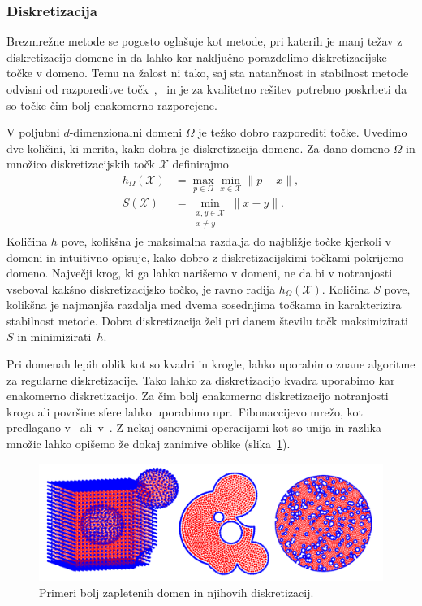 \documentclass[12pt,a4paper,twoside]{article}
\theoremstyle{definition} %
\theoremstyle{plain} %
\numberwithin{equation}{section}
\newcommand{\X}{\mathcal{X}}
\begin{document}
\subsubsection{Diskretizacija}
Brezmrežne metode se pogosto oglašuje kot metode, pri katerih je manj težav z diskretizacijo domene
in da lahko kar naključno porazdelimo diskretizacijske točke v domeno. Temu na žalost ni tako, saj
sta natančnost in stabilnost metode odvisni od razporeditve
točk~\cite[slika~8]{kosec2016local},~\cite{amani2012mixed} in je za kvalitetno rešitev potrebno
poskrbeti da so točke čim bolj enakomerno razporejene.

V poljubni $d$-dimenzionalni domeni $\Omega$ je težko dobro razporediti točke.
Uvedimo dve količini, ki merita, kako dobra je diskretizacija domene.
Za dano domeno $\Omega$ in množico diskretizacijskih točk $\X$ definirajmo
\begin{align}
  h_\Omega(\X) &= \max_{p \in \Omega} \min_{x \in \X} \|p - x\|, \\
  \label{eq:def-hs}
  S(\X) &= \min_{\substack{x, y \in \X \\ x \neq y}} \|x-y\|.
\end{align}
Količina $h$ pove, kolikšna je maksimalna razdalja do najbližje točke kjerkoli v domeni in intuitivno
opisuje, kako dobro z diskretizacijskimi točkami pokrijemo domeno. Največji krog, ki ga lahko
narišemo v domeni, ne da bi v notranjosti vseboval kakšno diskretizacijsko točko, je ravno radija
$h_\Omega(\X)$. Količina $S$ pove, kolikšna je najmanjša razdalja med dvema sosednjima točkama in
karakterizira stabilnost metode. Dobra diskretizacija želi pri danem številu točk maksimizirati $S$
in minimizirati~$h$.

Pri domenah lepih oblik kot so kvadri in krogle, lahko uporabimo znane algoritme za regularne
diskretizacije. Tako lahko za diskretizacijo kvadra uporabimo kar enakomerno diskretizacijo. Za
čim bolj enakomerno diskretizacijo notranjosti kroga ali površine sfere lahko uporabimo
npr.~Fibonaccijevo mrežo, kot predlagano v~\cite{hannay2004fibonacci}
ali~v~\cite{gonzalez2010measurement}.
Z nekaj osnovnimi operacijami kot so unija in razlika množic lahko opišemo že dokaj zanimive oblike
(slika~\ref{fig:domains}).

\begin{figure}[!ht]
  \centering
  \includegraphics[width=\textwidth]{images/domains_generated.png}
  \caption{Primeri bolj zapletenih domen in njihovih diskretizacij.}
  \label{fig:domains}
\end{figure}
\end{document}
